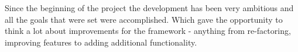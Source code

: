 Since the beginning of the project the development has been very ambitious and all
the goals that were set were accomplished. Which gave the opportunity to think a lot about
improvements for the framework - anything from re-factoring, improving features to adding
additional functionality.